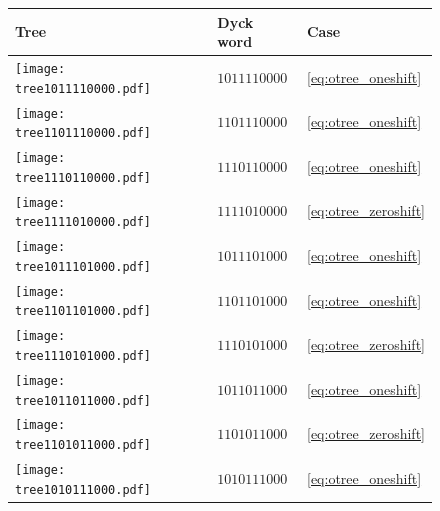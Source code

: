 \begin{figure}[ht]
\centering
\begin{minipage}[t]{0.31\linewidth}
\vspace{0pt}
\centering
\begin{tabular}{| m{1.9em} m{5em} m{} |} \hline
Tree & Dyck word & Case \\ \hline
\texttt{[image: tree1011110000.pdf]} & $1011110000$ & \eqref{eq:otree_oneshift}  \\ \hline
\texttt{[image: tree1101110000.pdf]} & $1101110000$ & \eqref{eq:otree_oneshift}  \\ \hline
\texttt{[image: tree1110110000.pdf]} & $1110110000$ & \eqref{eq:otree_oneshift}  \\ \hline
\texttt{[image: tree1111010000.pdf]} & $1111010000$ & \eqref{eq:otree_zeroshift} \\ \hline
\texttt{[image: tree1011101000.pdf]} & $1011101000$ & \eqref{eq:otree_oneshift}  \\ \hline
\texttt{[image: tree1101101000.pdf]} & $1101101000$ & \eqref{eq:otree_oneshift}  \\ \hline
\texttt{[image: tree1110101000.pdf]} & $1110101000$ & \eqref{eq:otree_zeroshift} \\ \hline
\texttt{[image: tree1011011000.pdf]} & $1011011000$ & \eqref{eq:otree_oneshift}  \\ \hline
\texttt{[image: tree1101011000.pdf]} & $1101011000$ & \eqref{eq:otree_zeroshift} \\ \hline
\texttt{[image: tree1010111000.pdf]} & $1010111000$ & \eqref{eq:otree_oneshift}  \\ \hline

\end{tabular}
\end{minipage}
\end{figure}
